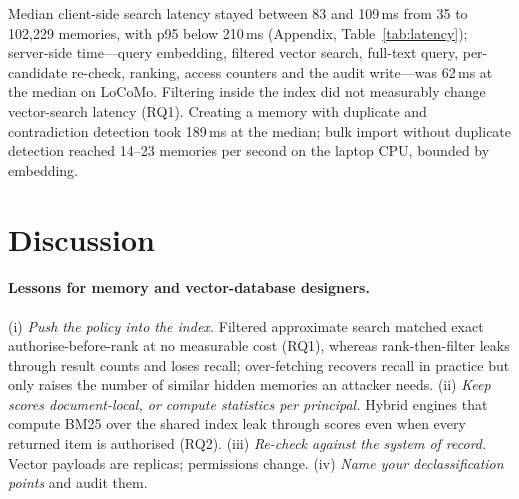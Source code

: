 \documentclass[11pt,a4paper]{article}
\theoremstyle{remark}
\begin{document}
Median client-side search latency stayed between 83 and 109\,ms from 35 to 102{,}229 memories, with p95 below 210\,ms
(Appendix, Table~\ref{tab:latency}); server-side time---query embedding, filtered vector search, full-text query,
per-candidate re-check, ranking, access counters and the audit write---was 62\,ms at the median on LoCoMo. Filtering inside
the index did not measurably change vector-search latency (RQ1). Creating a memory with duplicate and contradiction detection took 189\,ms
at the median; bulk import without duplicate detection reached 14--23 memories per second on the laptop CPU, bounded by
embedding.

\section{Discussion}
\label{sec:discussion}

\paragraph{Lessons for memory and vector-database designers.} (i) \emph{Push the policy into the index.} Filtered
approximate search matched exact authorise-before-rank at no measurable cost (RQ1), whereas rank-then-filter leaks through
result counts and loses recall; over-fetching recovers recall in practice but only raises the number of similar hidden
memories an attacker needs. (ii) \emph{Keep scores document-local, or compute statistics per principal.} Hybrid engines
that compute BM25 over the shared index leak through scores even when every returned item is authorised (RQ2).
(iii) \emph{Re-check against the system of record.} Vector payloads are replicas; permissions change. (iv) \emph{Name your
declassification points} and audit them.
\end{document}
